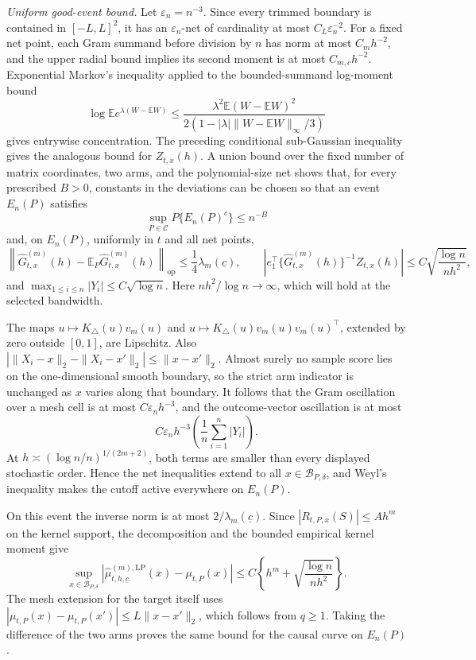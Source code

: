 \emph{Uniform good-event bound.}
Let \(\varepsilon_n=n^{-3}\).  Since every trimmed boundary is contained in \([-L,L]^2\), it has an \(\varepsilon_n\)-net of cardinality at most \(C_L\varepsilon_n^{-2}\).  For a fixed net point, each Gram summand before division by \(n\) has norm at most \(C_mh^{-2}\), and the upper radial bound implies its second moment is at most \(C_{m,\overline c}h^{-2}\).  Exponential Markov's inequality applied to the bounded-summand log-moment bound
\[
 \log\mathbb E e^{\lambda(W-\mathbb EW)}
 \leq\frac{\lambda^2\mathbb E(W-\mathbb EW)^2}
 {2(1-|\lambda|\|W-\mathbb EW\|_\infty/3)}
\]
gives entrywise concentration.  The preceding conditional sub-Gaussian inequality gives the analogous bound for \(Z_{t,x}(h)\).  A union bound over the fixed number of matrix coordinates, two arms, and the polynomial-size net shows that, for every prescribed \(B>0\), constants in the deviations can be chosen so that an event \(E_n(P)\) satisfies
\[
 \sup_{P\in\mathcal C}P\{E_n(P)^c\}\leq n^{-B}
\]
and, on \(E_n(P)\), uniformly in \(t\) and all net points,
\[
 \left\|\widehat G^{(m)}_{t,x}(h)
 -\mathbb E_P\widehat G^{(m)}_{t,x}(h)\right\|_{\mathrm{op}}
 \leq\frac14\lambda_m(\underline c),
 \qquad
 \left|e_1^\top\{\widehat G^{(m)}_{t,x}(h)\}^{-1}Z_{t,x}(h)\right|
 \leq C\sqrt{\frac{\log n}{nh^2}},
\]
and \(\max_{1\leq i\leq n}|Y_i|\leq C\sqrt{\log n}\).  Here \(nh^2/\log n\to\infty\), which will hold at the selected bandwidth.

The maps \(u\mapsto K_\triangle(u)v_m(u)\) and \(u\mapsto K_\triangle(u)v_m(u)v_m(u)^\top\), extended by zero outside \([0,1]\), are Lipschitz.  Also \(|\|X_i-x\|_2-\|X_i-x'\|_2|\leq\|x-x'\|_2\).  Almost surely no sample score lies on the one-dimensional smooth boundary, so the strict arm indicator is unchanged as \(x\) varies along that boundary.  It follows that the Gram oscillation over a mesh cell is at most \(C\varepsilon_nh^{-3}\), and the outcome-vector oscillation is at most
\[
 C\varepsilon_nh^{-3}\left(\frac1n\sum_{i=1}^n|Y_i|\right).
\]
At \(h\asymp(\log n/n)^{1/(2m+2)}\), both terms are smaller than every displayed stochastic order.  Hence the net inequalities extend to all \(x\in\mathcal B_{P,\delta}\), and Weyl's inequality makes the cutoff active everywhere on \(E_n(P)\).

On this event the inverse norm is at most \(2/\lambda_m(\underline c)\).  Since \(|R_{t,P,x}(S)|\leq Ah^m\) on the kernel support, the decomposition and the bounded empirical kernel moment give
\[
 \sup_{x\in\mathcal B_{P,\delta}}
 \left|\widehat\mu^{(m),\mathrm{LP}}_{t,h,\underline c}(x)-\mu_{t,P}(x)\right|
 \leq C\left\{h^m+\sqrt{\frac{\log n}{nh^2}}\right\}.
\]
The mesh extension for the target itself uses
\(|\mu_{t,P}(x)-\mu_{t,P}(x')|\leq L\|x-x'\|_2\), which follows from \(q\geq1\).  Taking the difference of the two arms proves the same bound for the causal curve on \(E_n(P)\).

